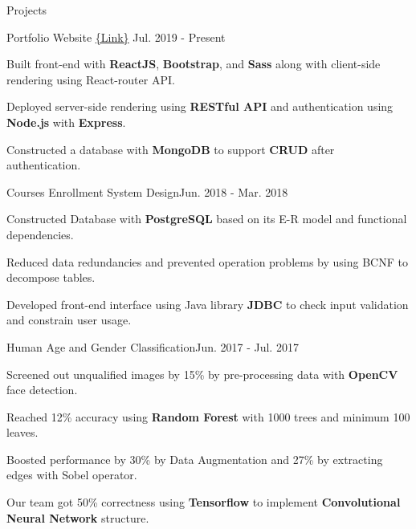 \documentclass{resume} %
\begin{document}
\begin{rSection}{Projects}

\begin{rSubsection}{Portfolio Website \scriptsize{\href{https://shang-yun-portfolio-website.herokuapp.com/}{\{Link\}}} }{Jul. 2019 - Present}{}{}
\item Built front-end with \textbf{ReactJS}, \textbf{Bootstrap}, and \textbf{Sass} along with client-side rendering using React-router API.
\item Deployed server-side rendering using \textbf{RESTful API} and authentication using \textbf{Node.js} with \textbf{Express}.
\item Constructed a database with \textbf{MongoDB} to support \textbf{CRUD} after authentication.
\end{rSubsection}

\begin{rSubsection}{Courses Enrollment System Design}{Jun. 2018 - Mar. 2018}{}{}
\item Constructed Database with \textbf{PostgreSQL} based on its E-R model and functional dependencies.
\item Reduced data redundancies and prevented operation problems by using BCNF to decompose tables.
\item Developed front-end interface using Java library \textbf{JDBC} to check input validation and constrain user usage.

\end{rSubsection}

\begin{rSubsection}{Human Age and Gender Classification}{Jun. 2017 - Jul. 2017}{}{}
\item Screened out unqualified images by 15\% by pre-processing data with \textbf{OpenCV} face detection. 
\item Reached 12\% accuracy using \textbf{Random Forest} with 1000 trees and minimum 100 leaves.
\item Boosted performance by 30\% by Data Augmentation and 27\% by extracting edges with Sobel operator.
\item Our team got 50\% correctness using \textbf{Tensorflow} to implement \textbf{Convolutional Neural Network} structure.
\end{rSubsection}
 

\end{rSection}
\end{document}
